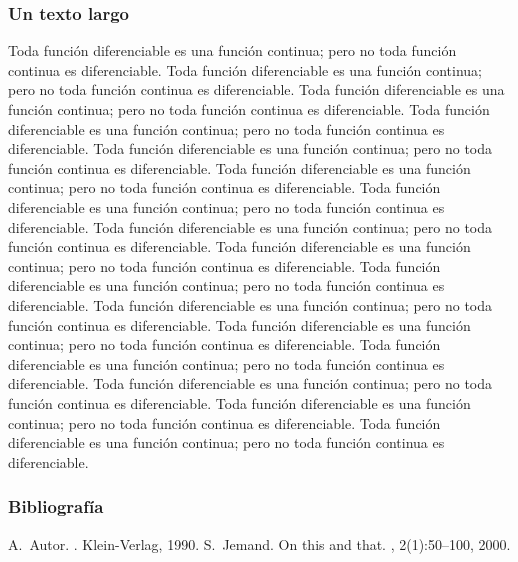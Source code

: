 \documentclass{beamer}
\begin{document}
\begin{frame}[allowframebreaks] 
\frametitle{Un texto largo}
 Toda función diferenciable  es una función continua; pero no toda función continua es diferenciable. Toda función diferenciable  es una función continua; pero no toda función continua es diferenciable. \framebreak Toda función diferenciable  es una función continua; pero no toda función continua es diferenciable. Toda función diferenciable  es una función continua; pero no toda función continua es diferenciable. Toda función diferenciable  es una función continua; pero no toda función continua es diferenciable. Toda función diferenciable  es una función continua; pero no toda función continua es diferenciable. Toda función diferenciable  es una función continua; pero no toda función continua es diferenciable.  Toda función diferenciable  es una función continua; pero no toda función continua es diferenciable. Toda función diferenciable  es una función continua; pero no toda función continua es diferenciable. Toda función diferenciable  es una función continua; pero no toda función continua es diferenciable.  Toda función diferenciable  es una función continua; pero no toda función continua es diferenciable. Toda función diferenciable  es una función continua; pero no toda función continua es diferenciable. Toda función diferenciable  es una función continua; pero no toda función continua es diferenciable. Toda función diferenciable  es una función continua; pero no toda función continua es diferenciable.
  Toda función diferenciable  es una función continua; pero no toda función continua es diferenciable. Toda función diferenciable  es una función continua; pero no toda función continua es diferenciable.
  \cite{Autor1990}
\end{frame}
\begin{frame}[allowframebreaks]
  \frametitle{Bibliografía}
  \begin{thebibliography}{10}    
  \beamertemplatebookbibitems
    A.~Autor.
    .
    \newblock Klein-Verlag, 1990.
  \beamertemplatearticlebibitems
    S.~Jemand.
    \newblock On this and that.
    , 2(1):50--100, 2000.
  \end{thebibliography}
\end{frame}
\end{document}
